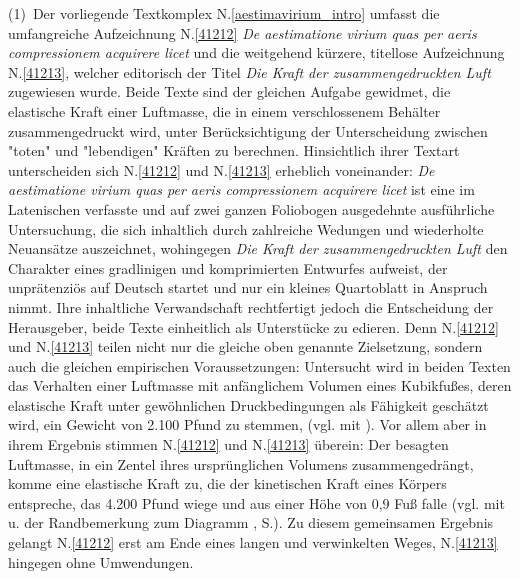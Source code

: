 \footnotesize%
\pstart%
\noindent%
%
(1)~Der vorliegende Textkomplex N.\;\ref{aestimavirium_intro} umfasst die umfangreiche Aufzeichnung N.\;\ref{41212} \textit{De aestimatione virium quas per aeris compressionem acquirere licet} und die weitgehend kürzere, titellose Aufzeichnung N.\;\ref{41213}, welcher editorisch der Titel \textit{Die Kraft der zusammengedruckten Luft} zugewiesen wurde.
Beide Texte sind der gleichen Aufgabe gewidmet, die elastische Kraft einer Luftmasse, die in einem verschlossenem Behälter zusammengedruckt wird, unter Berücksichtigung der Unterscheidung zwischen "toten" und "lebendigen" Kräften zu berechnen.
Hinsichtlich ihrer Textart unterscheiden sich N.\;\ref{41212} und N.\;\ref{41213} erheblich voneinander: \textit{De aestimatione virium quas per aeris compressionem acquirere licet} ist eine im Latenischen verfasste und auf zwei ganzen Foliobogen ausgedehnte ausführliche Untersuchung, die sich inhaltlich durch zahlreiche Wedungen und wiederholte Neuansätze auszeichnet, wohingegen \textit{Die Kraft der zusammengedruckten Luft} den Charakter eines gradlinigen und komprimierten Entwurfes aufweist, der unprätenziös auf Deutsch startet und nur ein kleines Quartoblatt in Anspruch nimmt.
Ihre inhaltliche Verwandschaft rechtfertigt jedoch die Entscheidung der Herausgeber, beide Texte einheitlich als Unterstücke zu edieren.
Denn N.\;\ref{41212} und N.\;\ref{41213} teilen nicht nur die gleiche oben genannte Zielsetzung, sondern auch die gleichen empirischen Voraussetzungen:
Untersucht wird in beiden Texten das Verhalten einer Luftmasse mit anfänglichem Volumen eines Kubikfußes, deren elastische Kraft unter gewöhnlichen Druckbedingungen als Fähigkeit geschätzt wird, ein Gewicht von 2.100 Pfund zu stemmen, (vgl.  mit ).
Vor allem aber in ihrem Ergebnis stimmen N.\;\ref{41212} und N.\;\ref{41213} überein:
Der besagten Luftmasse, in ein Zentel ihres ursprünglichen Volumens zusammengedrängt, komme eine elastische Kraft zu, die der kinetischen Kraft eines Körpers entspreche, das 4.200 Pfund wiege und aus einer Höhe von 0,9 Fuß falle %
(vgl.  mit  u. der Randbemerkung zum Diagramm , S.\;\pageref{LH_35_09_25_003_003v_Fig4}).
\pend%
\pstart%
Zu diesem gemeinsamen Ergebnis gelangt N.\;\ref{41212} erst am Ende eines langen und verwinkelten Weges, N.\;\ref{41213} hingegen ohne Umwendungen.
